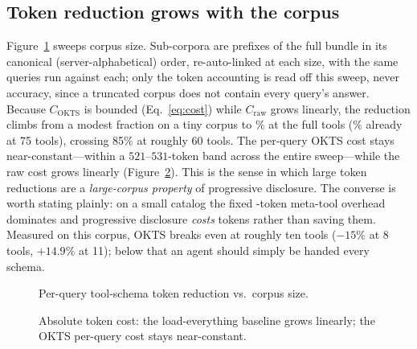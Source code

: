 \documentclass[11pt]{article}
\begin{document}
\subsection{Token reduction grows with the corpus}

Figure~\ref{fig:reduction} sweeps corpus size. Sub-corpora are prefixes of the
full bundle in its canonical (server-alphabetical) order, re-auto-linked at each
size, with the same \numQueries{} queries run against each; only the token
accounting is read off this sweep, never accuracy, since a truncated corpus does
not contain every query's answer. Because $C_\text{OKTS}$ is bounded
(Eq.~\ref{eq:cost}) while $C_\text{raw}$ grows linearly, the reduction climbs from
a modest fraction on a tiny corpus to \reductionFull\% at the full \numTools{}
tools (\reductionSeventyFive\% already at 75 tools), crossing 85\% at roughly 60
tools. The per-query OKTS cost stays near-constant---within a
$521$--$531$-token band across the entire sweep---while the raw cost grows
linearly (Figure~\ref{fig:tokens}). This is the sense in which large token
reductions are a \emph{large-corpus property} of progressive disclosure. The
converse is worth stating plainly: on a small catalog the fixed
\metaToolTokens-token meta-tool overhead dominates and progressive disclosure
\emph{costs} tokens rather than saving them. Measured on this corpus, OKTS breaks
even at roughly ten tools ($-15\%$ at 8 tools, $+14.9\%$ at 11); below that an
agent should simply be handed every schema.

\begin{figure}[h]
\centering
{}
\caption{Per-query tool-schema token reduction vs.\ corpus size.}
\label{fig:reduction}
\end{figure}

\begin{figure}[h]
\centering
{}
\caption{Absolute token cost: the load-everything baseline grows linearly; the
OKTS per-query cost stays near-constant.}
\label{fig:tokens}
\end{figure}
\end{document}
